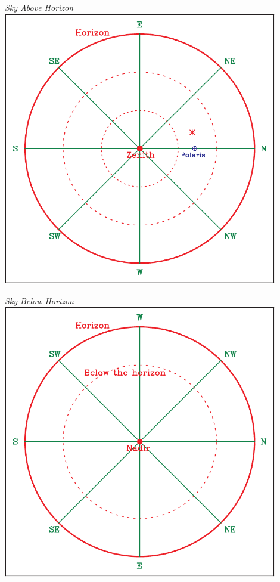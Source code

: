 \documentclass[12pt]{article}
\begin{document}
\begin{enumerate}
		\begin{center}
		\begin{minipage}{0.45\textwidth}
			\begin{center}
\it Sky Above Horizon\\
				\includegraphics[width=0.9\textwidth]{quiz-1-crop.pdf}
			\end{center}
		\end{minipage}
		\begin{minipage}{0.45\textwidth}
			\begin{center}
				\it Sky Below Horizon\\
				\includegraphics[width=0.9\textwidth]{botsky-crop.pdf}
			\end{center}
		\end{minipage}
		\end{center}
		

\end{enumerate}
\end{document}
